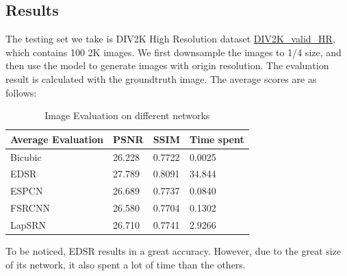 \documentclass[10pt,twocolumn,letterpaper]{article}
\begin{document}
\subsection{Results}
The testing set we take is DIV2K High Resolution dataset \href{https://data.vision.ee.ethz.ch/cvl/DIV2K}{DIV2K\_valid\_HR}, 
which contains 100 2K images.
We first downsample the images to 1/4 size, and then use the model to generate images with origin resolution.
The evaluation result is calculated with the groundtruth image.
The average scores are as follows:
\begin{table}[H]
    \centering
    \caption{Image Evaluation on different networks}
    \begin{tabular}{|l|l|l|l|}
    \hline
    Average Evaluation  & PSNR   & SSIM   & Time spent  \\ \hline
    Bicubic             & 26.228 & 0.7722 & 0.0025      \\ \hline
    EDSR                & 27.789 & 0.8091 & 34.844      \\ \hline
    ESPCN               & 26.689 & 0.7737 & 0.0840      \\ \hline
    FSRCNN              & 26.580 & 0.7704 & 0.1302      \\ \hline
    LapSRN              & 26.710 & 0.7741 & 2.9266      \\ \hline
    \end{tabular}
\end{table}
To be noticed, EDSR results in a great accuracy. 
However, due to the great size of its network, it also spent a lot of time than the others.
\end{document}
